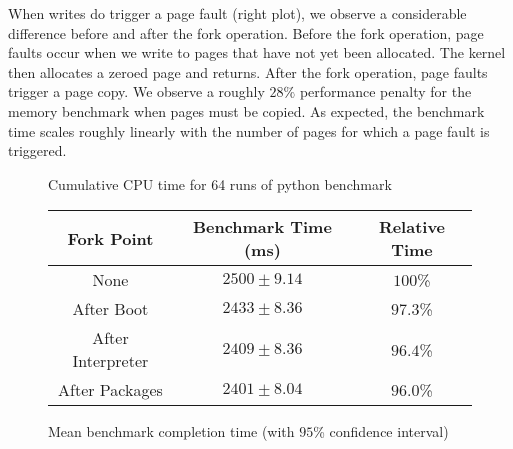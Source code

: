 When writes do trigger a page fault (right plot), we observe a considerable
difference before and after the fork operation. Before the fork operation, page
faults occur when we write to pages that have not yet been allocated. The
kernel then allocates a zeroed page and returns. After the fork operation, page
faults trigger a page copy. We observe a roughly $28\%$ performance penalty for
the memory benchmark when pages must be copied. As expected, the benchmark time
scales roughly linearly with the number of pages for which a page fault is
triggered.


\pgfplotsset{compat=1.5}
\begin{figure*}
  \center
  \label{fig:pybench}
\caption{Cumulative CPU time for 64 runs of python benchmark}
\label{fig:pycpu}
\end{figure*}

\begin{figure*}
  \center
  \begin{tabular}{|c|c|c|}
    \hline
    Fork Point & Benchmark Time (ms) & Relative Time \\ \hline
    None & $2500 \pm 9.14$ & $100$\% \\ \hline
    After Boot & $2433 \pm 8.36$ & $97.3$\% \\ \hline
    After Interpreter & $2409 \pm 8.36$ & $96.4$\% \\ \hline
    After Packages & $2401 \pm 8.04$ & $96.0$\% \\ \hline
  \end{tabular}

  \caption{Mean benchmark completion time (with $95$\% confidence interval)}
  \label{fig:pybench}
\end{figure*}


